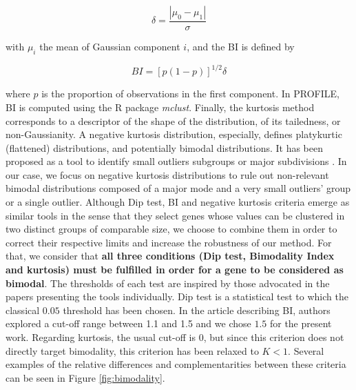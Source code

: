 \documentclass[a4paper,12pt,twoside,onecolumn,openright,final,oldfontcommands]{memoir}
\begin{document}
\[\delta = \dfrac{|\mu_0-\mu_1|}{\sigma}\]

with \(\mu_i\) the mean of Gaussian component \(i\), and the BI is
defined by

\[BI=[p(1-p)]^{1/2}\delta\]

where \(p\) is the proportion of observations in the first component. In
PROFILE, BI is computed using the R package \emph{mclust}. Finally, the
kurtosis method corresponds to a descriptor of the shape of the
distribution, of its tailedness, or non-Gaussianity. A negative kurtosis
distribution, especially, defines platykurtic (flattened) distributions,
and potentially bimodal distributions. It has been proposed as a tool to
identify small outliers subgroups or major subdivisions
\citep{teschendorff2006pack}. In our case, we focus on negative kurtosis
distributions to rule out non-relevant bimodal distributions composed of
a major mode and a very small outliers' group or a single outlier.
Although Dip test, BI and negative kurtosis criteria emerge as similar
tools in the sense that they select genes whose values can be clustered
in two distinct groups of comparable size, we choose to combine them in
order to correct their respective limits and increase the robustness of
our method. For that, we consider that \textbf{all three conditions (Dip
test, Bimodality Index and kurtosis) must be fulfilled in order for a
gene to be considered as bimodal}. The thresholds of each test are
inspired by those advocated in the papers presenting the tools
individually. Dip test is a statistical test to which the classical
\(0.05\) threshold has been chosen. In the article describing BI,
authors explored a cut-off range between 1.1 and 1.5 and we chose
\(1.5\) for the present work. Regarding kurtosis, the usual cut-off is
\(0\), but since this criterion does not directly target bimodality,
this criterion has been relaxed to \(K < 1\). Several examples of the
relative differences and complementarities between these criteria can be
seen in Figure \ref{fig:bimodality}.
\end{document}
